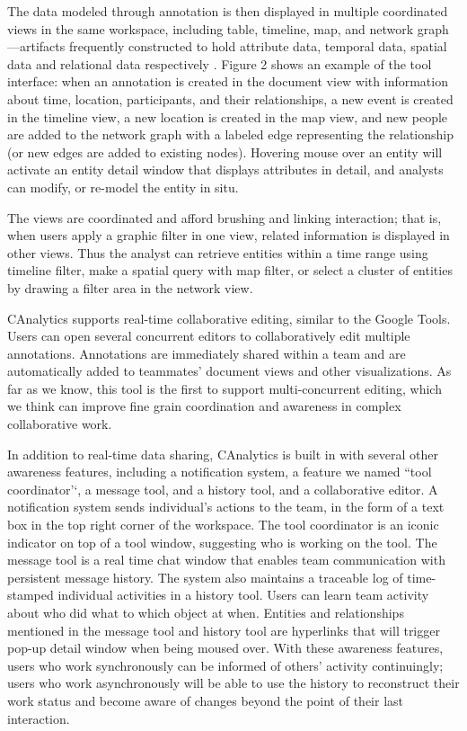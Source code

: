 \documentclass[]{article}
\begin{document}
The data modeled through annotation is then displayed in multiple
coordinated views in the same workspace, including table, timeline, map,
and network graph---artifacts frequently constructed to hold attribute
data, temporal data, spatial data and relational data respectively
\autocite{Carroll2013}. Figure 2 shows an example of the tool interface:
when an annotation is created in the document view with information
about time, location, participants, and their relationships, a new event
is created in the timeline view, a new location is created in the map
view, and new people are added to the network graph with a labeled edge
representing the relationship (or new edges are added to existing
nodes). Hovering mouse over an entity will activate an entity detail
window that displays attributes in detail, and analysts can modify, or
re-model the entity in situ.

The views are coordinated and afford brushing and linking interaction;
that is, when users apply a graphic filter in one view, related
information is displayed in other views. Thus the analyst can retrieve
entities within a time range using timeline filter, make a spatial query
with map filter, or select a cluster of entities by drawing a filter
area in the network view.

CAnalytics supports real-time collaborative editing, similar to the
Google Tools. Users can open several concurrent editors to
collaboratively edit multiple annotations. Annotations are immediately
shared within a team and are automatically added to teammates' document
views and other visualizations. As far as we know, this tool is the
first to support multi-concurrent editing, which we think can improve
fine grain coordination and awareness in complex collaborative work.

In addition to real-time data sharing, CAnalytics is built in with
several other awareness features, including a notification system, a
feature we named ``tool coordinator'`, a message tool, and a history
tool, and a collaborative editor. A notification system sends
individual's actions to the team, in the form of a text box in the top
right corner of the workspace. The tool coordinator is an iconic
indicator on top of a tool window, suggesting who is working on the
tool. The message tool is a real time chat window that enables team
communication with persistent message history. The system also maintains
a traceable log of time-stamped individual activities in a history tool.
Users can learn team activity about who did what to which object at
when. Entities and relationships mentioned in the message tool and
history tool are hyperlinks that will trigger pop-up detail window when
being moused over. With these awareness features, users who work
synchronously can be informed of others' activity continuingly; users
who work asynchronously will be able to use the history to reconstruct
their work status and become aware of changes beyond the point of their
last interaction.
\end{document}
